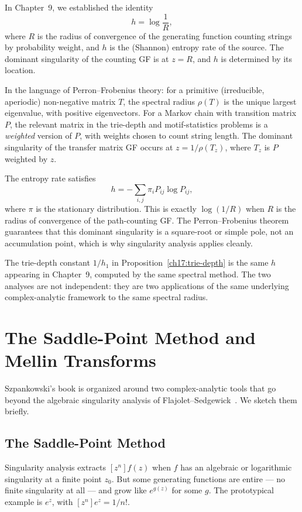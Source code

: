 In Chapter~9, we established the identity
\[
  h = \log\frac{1}{R},
\]
where $R$ is the radius of convergence of the generating function counting strings by probability weight, and $h$ is the (Shannon) entropy rate of the source. The dominant singularity of the counting GF is at $z = R$, and $h$ is determined by its location.

In the language of Perron--Frobenius theory: for a primitive (irreducible, aperiodic) non-negative matrix $T$, the spectral radius $\rho(T)$ is the unique largest eigenvalue, with positive eigenvectors. For a Markov chain with transition matrix $P$, the relevant matrix in the trie-depth and motif-statistics problems is a \emph{weighted} version of $P$, with weights chosen to count string length. The dominant singularity of the transfer matrix GF occurs at $z = 1/\rho(T_z)$, where $T_z$ is $P$ weighted by $z$.

The entropy rate satisfies
\[
  h = -\sum_{i,j} \pi_i P_{ij} \log P_{ij},
\]
where $\pi$ is the stationary distribution. This is exactly $\log(1/R)$ when $R$ is the radius of convergence of the path-counting GF. The Perron--Frobenius theorem guarantees that this dominant singularity is a square-root or simple pole, not an accumulation point, which is why singularity analysis applies cleanly.

The trie-depth constant $1/h_1$ in Proposition~\ref{ch17:trie-depth} is the same $h$ appearing in Chapter~9, computed by the same spectral method. The two analyses are not independent: they are two applications of the same underlying complex-analytic framework to the same spectral radius.

\section{The Saddle-Point Method and Mellin Transforms}
\label{ch17:methods}

Szpankowski's book is organized around two complex-analytic tools that go beyond the algebraic singularity analysis of Flajolet--Sedgewick~\cite{FlajoletSedgewick2009}. We sketch them briefly.

\subsection{The Saddle-Point Method}
\label{ch17:saddle-point}

Singularity analysis extracts $[z^n] f(z)$ when $f$ has an algebraic or logarithmic singularity at a finite point $z_0$. But some generating functions are entire --- no finite singularity at all --- and grow like $e^{g(z)}$ for some $g$. The prototypical example is $e^z$, with $[z^n] e^z = 1/n!$.

